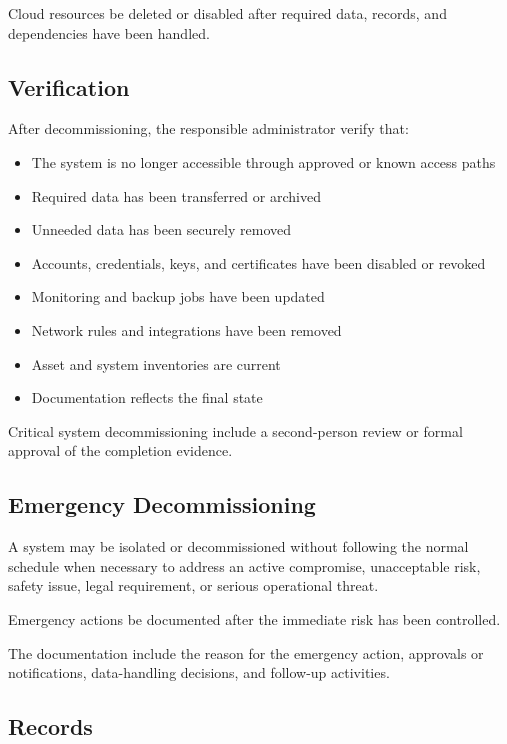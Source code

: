 Cloud resources \must{} be deleted or disabled after required data, records, and dependencies have been handled.

\subsection{Verification}

After decommissioning, the responsible administrator \must{} verify that:
\begin{itemize}
    \item The system is no longer accessible through approved or known access paths
    \item Required data has been transferred or archived
    \item Unneeded data has been securely removed
    \item Accounts, credentials, keys, and certificates have been disabled or revoked
    \item Monitoring and backup jobs have been updated
    \item Network rules and integrations have been removed
    \item Asset and system inventories are current
    \item Documentation reflects the final state
\end{itemize}

Critical system decommissioning \should{} include a second-person review or formal approval of the completion evidence.

\subsection{Emergency Decommissioning}

A system may be isolated or decommissioned without following the normal schedule when necessary to address an active compromise, unacceptable risk, safety issue, legal requirement, or serious operational threat.

Emergency actions \must{} be documented after the immediate risk has been controlled.

The documentation \must{} include the reason for the emergency action, approvals or notifications, data-handling decisions, and follow-up activities.

\subsection{Records}

